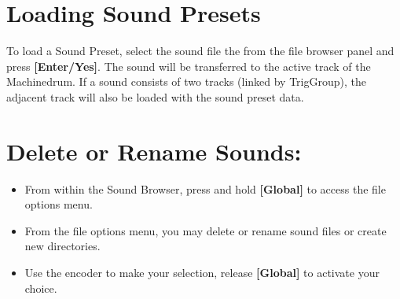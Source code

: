 \section{Loading Sound Presets}
To load a Sound Preset, select the sound file the from the file browser panel and press \textbf{[Enter/Yes]}. The sound will be transferred to the active track of the Machinedrum. If a sound consists of two tracks (linked by TrigGroup), the adjacent track will also be loaded with the sound preset data.\\
\section{Delete or Rename Sounds:}
\begin{itemize}
\item From within the Sound Browser, press and hold \textbf{[Global]} to access the file options menu.
\item From the file options menu, you may delete or rename sound files or create new directories.
\item Use the encoder to make your selection, release \textbf{[Global]} to activate your choice.
\end{itemize}


